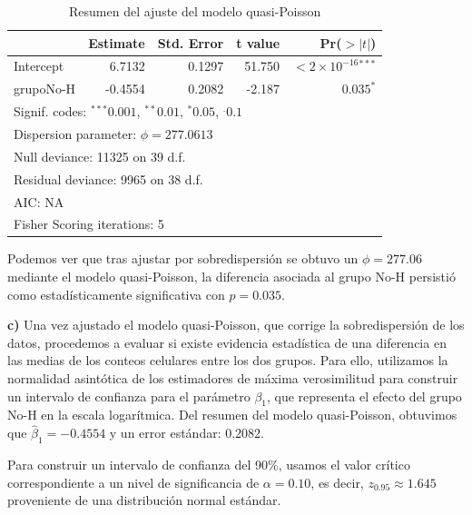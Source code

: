 \begin{table}[H]
\centering
\caption{Resumen del ajuste del modelo quasi-Poisson}
\begin{tabular}{lrrrr}
\hline
 & Estimate & Std. Error & t value & Pr($>|t|$) \\
\hline
Intercept  & 6.7132 & 0.1297 & 51.750 & $<2\times 10^{-16}$$^{***}$ \\
grupoNo-H  & -0.4554 & 0.2082 & -2.187 & $0.035^{*}$ \\
\hline
\multicolumn{5}{l}{\footnotesize Signif. codes: $^{***}0.001$, $^{**}0.01$, $^{*}0.05$, $^{.}0.1$} \\
\multicolumn{5}{l}{\footnotesize Dispersion parameter: $\phi = 277.0613$} \\
\multicolumn{5}{l}{\footnotesize Null deviance: 11325 on 39 d.f.} \\
\multicolumn{5}{l}{\footnotesize Residual deviance: 9965 on 38 d.f.} \\
\multicolumn{5}{l}{\footnotesize AIC: NA} \\
\multicolumn{5}{l}{\footnotesize Fisher Scoring iterations: 5} \\
\end{tabular}
\end{table}

\begin{tcolorbox}
Podemos ver que tras ajustar por sobredispersión se obtuvo un $\phi = 277.06$ mediante el modelo quasi-Poisson, la diferencia asociada al grupo No-H persistió como estadísticamente significativa con $p = 0.035$.
\end{tcolorbox}

\textbf{c)} Una vez ajustado el modelo quasi-Poisson, que corrige la sobredispersión de los datos, procedemos a evaluar si existe evidencia estadística de una diferencia en las medias de los conteos celulares entre los dos grupos. Para ello, utilizamos la normalidad asintótica de los estimadores de máxima verosimilitud para construir un intervalo de confianza para el parámetro $\beta_1$, que representa el efecto del grupo No-H en la escala logarítmica. Del resumen del modelo quasi-Poisson, obtuvimos que $\widehat{\beta}_1= -0.4554$ y un error estándar: 0.2082.

Para construir un intervalo de confianza del 90\%, usamos el valor crítico correspondiente a un nivel de significancia de $\alpha=0.10$, es decir, $z_{0.95}\approx1.645$ proveniente de una distribución normal estándar. 

